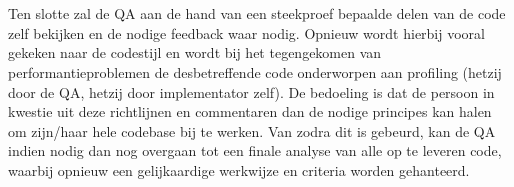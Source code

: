 \documentclass{article}
\begin{document}
\\\\
Ten slotte zal de QA aan de hand van een steekproef bepaalde delen van de code zelf bekijken en de nodige feedback waar nodig. Opnieuw wordt hierbij vooral gekeken naar de codestijl en wordt bij het tegengekomen van performantieproblemen de desbetreffende code onderworpen aan profiling (hetzij door de QA, hetzij door implementator zelf). De bedoeling is dat de persoon in kwestie uit deze richtlijnen en commentaren dan de nodige principes kan halen om zijn/haar hele codebase bij te werken. Van zodra dit is gebeurd, kan de QA indien nodig dan nog overgaan tot een finale analyse van alle op te leveren code, waarbij opnieuw een gelijkaardige werkwijze en criteria worden gehanteerd.

\clearpage
\end{document}
